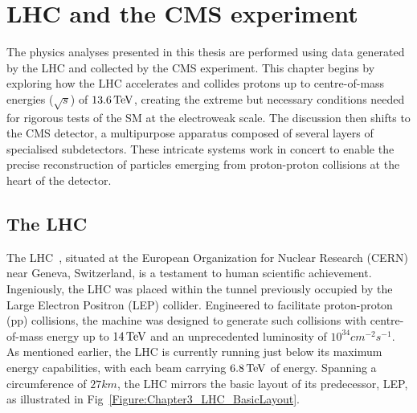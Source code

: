 \chapter{LHC and the CMS experiment}
\thispagestyle{plain}  %
\pagestyle{chapterpages}
\label{Section:Chapter3}

The physics analyses presented in this thesis are performed using data generated by the LHC and collected by the \ac{CMS} experiment. This chapter begins by exploring how the LHC accelerates and collides protons up to centre-of-mass energies ($\sqrt{s}$) of $13.6\,\text{Te\hspace{-.08em}V}$, creating the extreme but necessary conditions needed for rigorous tests of the SM at the electroweak scale. The discussion then shifts to the CMS detector, a multipurpose apparatus composed of several layers of specialised subdetectors. These intricate systems work in concert to enable the precise reconstruction of particles emerging from proton-proton collisions at the heart of the detector.

\section{The LHC}

The LHC~\cite{LHC_1}, situated at the European Organization for Nuclear Research (CERN) near Geneva, Switzerland, is a testament to human scientific achievement. Ingeniously, the LHC was placed within the tunnel previously occupied by the Large Electron Positron (LEP) collider. Engineered to facilitate proton-proton (pp) collisions, the machine was designed to generate such collisions with centre-of-mass energy up to $14\,\text{Te\hspace{-.08em}V}$ and an unprecedented luminosity of $10^{34}\unit{cm}^{-2}\unit{s}^{-1}$. As mentioned earlier, the LHC is currently running just below its maximum energy capabilities, with each beam carrying $6.8\,\text{Te\hspace{-.08em}V}$ of energy. Spanning a circumference of $27\unit{km}$, the LHC mirrors the basic layout of its predecessor, LEP, as illustrated in Fig~\ref{Figure:Chapter3_LHC_BasicLayout}. 

